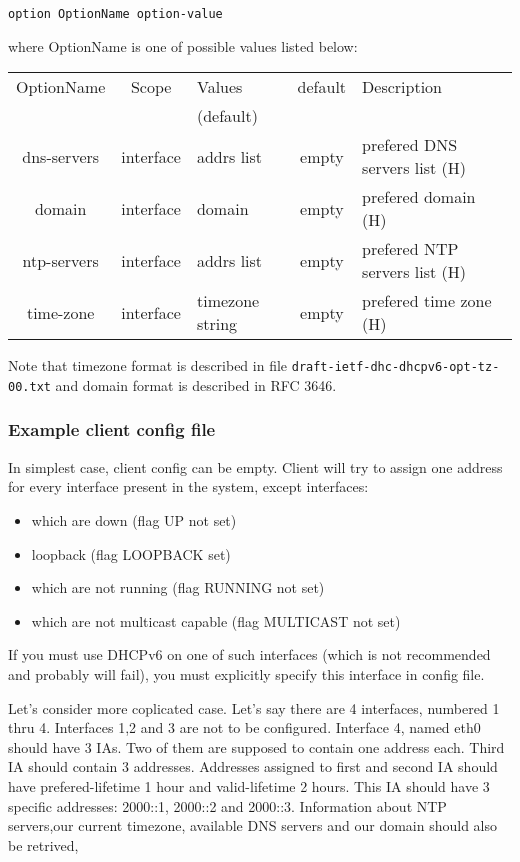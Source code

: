 \begin{verbatim}
option OptionName option-value
\end{verbatim}

where OptionName is one of possible values listed below:

\begin{center}
\begin{tabular}{|c|c|>{\centering}p{1.7cm}<{}|c|p{6cm}|}
\hline
OptionName     & Scope & Values    & default & Description \\
               &       & (default) &         & \\
\hline
dns-servers    & interface& addrs list      & empty & prefered DNS servers list (H) \\
domain         & interface& domain          & empty & prefered domain (H)\\
ntp-servers    & interface& addrs list      & empty & prefered NTP servers list (H)\\
time-zone      & interface& timezone string & empty & prefered time zone (H)\\
\hline
\end{tabular}
\end{center}

Note that timezone format is described in file \verb+draft-ietf-dhc-dhcpv6-opt-tz-00.txt+
and domain format is described in RFC 3646.

\subsubsection{Example client config file}

In simplest case, client config can be empty. Client will try to
assign one address for every interface present in the system, except
interfaces:
\begin{itemize}
\item which are down (flag UP not set)
\item loopback (flag LOOPBACK set)
\item which are not running (flag RUNNING not set)
\item which are not multicast capable (flag MULTICAST not set)
\end{itemize}

If you must use DHCPv6 on one of such interfaces (which is not
recommended and probably will fail), you must explicitly specify this
interface in config file.

Let's consider more coplicated case. Let's say there are 4 interfaces,
numbered 1 thru 4. Interfaces 1,2 and 3 are not to be
configured. Interface 4, named eth0 should have 3 IAs. Two of them are
supposed to contain one address each. Third IA should contain 3
addresses. Addresses assigned to first and second IA should have
prefered-lifetime 1 hour and valid-lifetime 2 hours. This IA should
have 3 specific addresses: 2000::1, 2000::2 and 2000::3. Information
about NTP servers,our current timezone, available DNS servers and our
domain should also be retrived,

